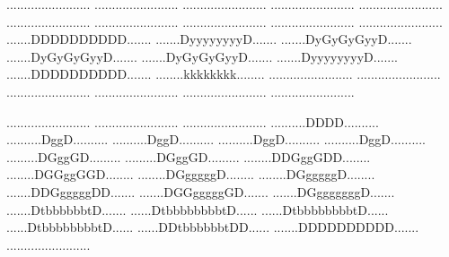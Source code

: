   {........................}
  {........................}
  {........................}
  {........................}
  {........................}
  {........................}
  {........................}
  {........................}
  {........................}
  {........................}
 {.......DDDDDDDDDD.......}
 {.......DyyyyyyyyD.......}
 {.......DyGyGyGyyD.......}
 {.......DyGyGyGyyD.......}
 {.......DyGyGyGyyD.......}
 {.......DyyyyyyyyD.......}
 {.......DDDDDDDDDD.......}
 {........kkkkkkkk........}
 {........................}
 {........................}
 {........................}
 {........................}
 {........................}
 {........................}

 {........................}
 {........................}
 {........................}
 {..........DDDD..........}
 {..........DggD..........}
 {..........DggD..........}
 {..........DggD..........}
 {..........DggD..........}
 {.........DGggGD.........}
 {.........DGggGD.........}
 {........DDGggGDD........}
 {........DGGggGGD........}
 {........DGgggggD........}
 {........DGgggggD........}
 {.......DDGgggggDD.......}
 {.......DGGgggggGD.......}
 {.......DGgggggggD.......}
 {.......DtbbbbbbtD.......}
 {......DtbbbbbbbbtD......}
 {......DtbbbbbbbbtD......}
 {......DtbbbbbbbbtD......}
 {......DDtbbbbbbtDD......}
 {.......DDDDDDDDDD.......}
 {........................}

